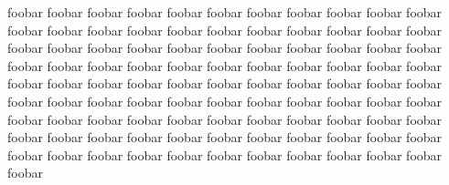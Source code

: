 foobar foobar foobar foobar foobar foobar foobar foobar foobar foobar
foobar foobar foobar foobar foobar foobar foobar foobar foobar foobar
foobar foobar foobar foobar foobar foobar foobar foobar foobar foobar
foobar foobar foobar foobar foobar foobar foobar foobar foobar foobar
foobar foobar foobar foobar foobar foobar foobar foobar foobar foobar
foobar foobar foobar foobar foobar foobar foobar foobar foobar foobar
foobar foobar foobar foobar foobar foobar foobar foobar foobar foobar
foobar foobar foobar foobar foobar foobar foobar foobar foobar foobar
foobar foobar foobar foobar foobar foobar foobar foobar foobar foobar
foobar foobar foobar foobar foobar foobar foobar foobar foobar foobar
